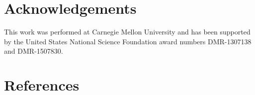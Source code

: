 \documentclass[preprint,1p,times,authoryear]{elsarticle}%
\begin{document}


\section{Acknowledgements }
This work was performed at Carnegie Mellon University and has been supported by the United States National Science Foundation award numbers DMR-1307138 and DMR-1507830.

\section{References}



\setcounter{equation}{0}
\setcounter{figure}{0}
\setcounter{table}{0}
\setcounter{page}{1}
\setcounter{section}{0}
\makeatletter
\renewcommand{\theequation}{S\arabic{equation}}
\renewcommand{\thefigure}{S\arabic{figure}}
\renewcommand{\thetable}{S\arabic{table}}
\renewcommand{\bibnumfmt}[1]{[S#1]}
\renewcommand{\citenumfont}[1]{S#1}
\end{document}
